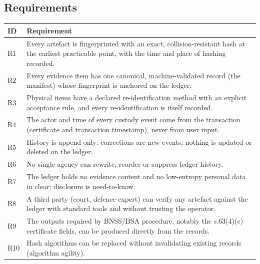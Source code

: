 \subsection{Requirements}
\label{sec:requirements}
\begin{center}\small
\begin{tabularx}{\linewidth}{@{}lX@{}}
\toprule
ID & Requirement \\
\midrule
R1 & Every artefact is fingerprinted with an exact, collision-resistant hash at the earliest practicable point, with the time and place of hashing recorded. \\
R2 & Every evidence item has one canonical, machine-validated record (the manifest) whose fingerprint is anchored on the ledger. \\
R3 & Physical items have a declared re-identification method with an explicit acceptance rule, and every re-identification is itself recorded. \\
R4 & The actor and time of every custody event come from the transaction (certificate and transaction timestamp), never from user input. \\
R5 & History is append-only: corrections are new events; nothing is updated or deleted on the ledger. \\
R6 & No single agency can rewrite, reorder or suppress ledger history. \\
R7 & The ledger holds no evidence content and no low-entropy personal data in clear; disclosure is need-to-know. \\
R8 & A third party (court, defence expert) can verify any artefact against the ledger with standard tools and without trusting the operator. \\
R9 & The outputs required by BNSS/BSA procedure, notably the s.63(4)(c) certificate fields, can be produced directly from the records. \\
R10 & Hash algorithms can be replaced without invalidating existing records (algorithm agility). \\
\bottomrule
\end{tabularx}
\end{center}
